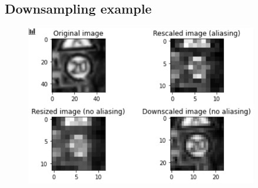 \documentclass[11pt]{article}
\begin{document}
\begin{appendices}
\subsection{Downsampling example}\label{fig:downsampleExample}
\begin{figure}[H]
    \centering
    \includegraphics[width=0.9\textwidth]{Images/downsample_example.png}
\end{figure}

\newpage

\end{appendices}
\end{document}

